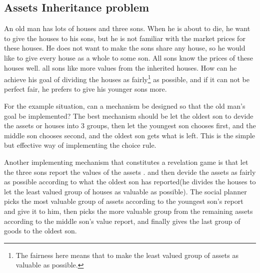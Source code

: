 \subsection{Assets Inheritance problem}
\label{assets_inheritance}
\begin{example}
An old man has lots of  houses and three sons. When he is about to die, he
want to give the houses to his sons, but he is not familiar with the
market prices for these houses. He does not want to make the sons
share any house, so he would like to  give every  house as a whole to some son. All  sons know the prices of these
houses well. all  sons like more values from the
inherited houses. How can he achieve his goal of dividing the houses as
fairly\footnote{The fairness here means that to make the least valued group of assets as valuable as possible.} as possible, and if it can not be perfect fair, he prefers to
give his younger sons more. 



\end{example} 

For the example situation, can a mechanism be designed so that the old
man's goal be implemented? The best mechanism should be let the oldest son to devide the assets or houses into 3 groups, then let the youngest son chooses first, and the middle son chooses second, and the oldest
son gets what is left. This is the simple but effective way of implementing the choice rule.

Another implementing  mechanism that constitutes a revelation game is that let the three sons report the values of the assets
. and then devide the assets as fairly as possible according to what the oldest son has reported(he divides the houses to let the least valued group of houses as valuable as possible). The social planner picks the most valuable group of assets according to the youngest son's report and 
give it to him, 
then picks the more valuable group from the remaining assets according to the middle son's value report, and finally gives the last group of goods to  the oldest son. 

